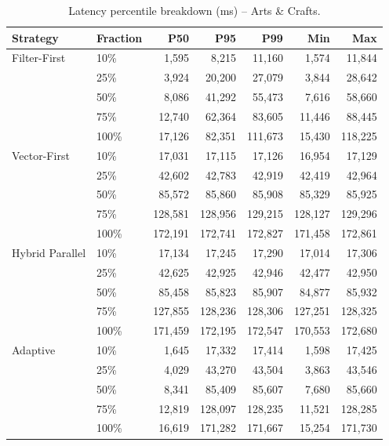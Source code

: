 \begin{table}[ht]
\centering
\small
\begin{tabular}{llrrrrr}
\hline
Strategy & Fraction & P50 & P95 & P99 & Min & Max \\
\hline
Filter-First & 10\% & 1,595 & 8,215 & 11,160 & 1,574 & 11,844 \\
 & 25\% & 3,924 & 20,200 & 27,079 & 3,844 & 28,642 \\
 & 50\% & 8,086 & 41,292 & 55,473 & 7,616 & 58,660 \\
 & 75\% & 12,740 & 62,364 & 83,605 & 11,446 & 88,445 \\
 & 100\% & 17,126 & 82,351 & 111,673 & 15,430 & 118,225 \\
\hline
Vector-First & 10\% & 17,031 & 17,115 & 17,126 & 16,954 & 17,129 \\
 & 25\% & 42,602 & 42,783 & 42,919 & 42,419 & 42,964 \\
 & 50\% & 85,572 & 85,860 & 85,908 & 85,329 & 85,925 \\
 & 75\% & 128,581 & 128,956 & 129,215 & 128,127 & 129,296 \\
 & 100\% & 172,191 & 172,741 & 172,827 & 171,458 & 172,861 \\
\hline
Hybrid Parallel & 10\% & 17,134 & 17,245 & 17,290 & 17,014 & 17,306 \\
 & 25\% & 42,625 & 42,925 & 42,946 & 42,477 & 42,950 \\
 & 50\% & 85,458 & 85,823 & 85,907 & 84,877 & 85,932 \\
 & 75\% & 127,855 & 128,236 & 128,306 & 127,251 & 128,325 \\
 & 100\% & 171,459 & 172,195 & 172,547 & 170,553 & 172,680 \\
\hline
Adaptive & 10\% & 1,645 & 17,332 & 17,414 & 1,598 & 17,425 \\
 & 25\% & 4,029 & 43,270 & 43,504 & 3,863 & 43,546 \\
 & 50\% & 8,341 & 85,409 & 85,607 & 7,680 & 85,660 \\
 & 75\% & 12,819 & 128,097 & 128,235 & 11,521 & 128,285 \\
 & 100\% & 16,619 & 171,282 & 171,667 & 15,254 & 171,730 \\
\hline
\end{tabular}
\caption{Latency percentile breakdown (ms) -- Arts \& Crafts.}
\label{tab:percentiles-arts_crafts_and_sewing}
\end{table}